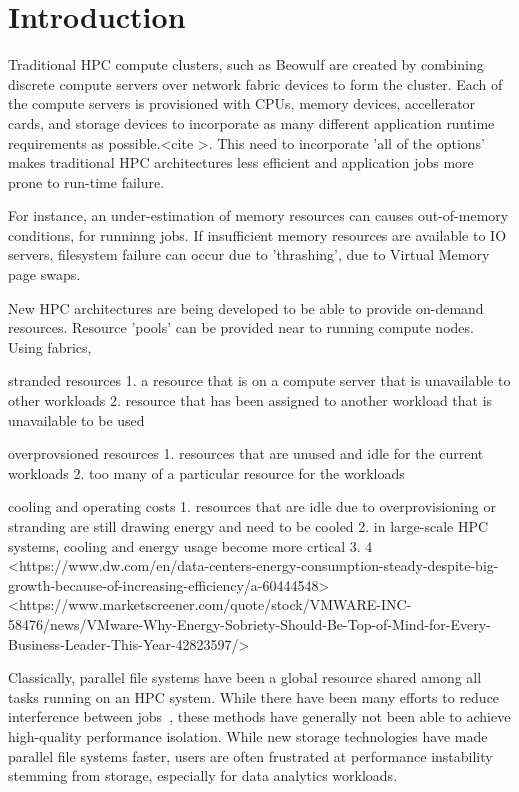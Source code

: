 \section{Introduction}

Traditional HPC compute clusters, such as Beowulf are created by combining discrete compute servers over network fabric devices to form the cluster.  Each of the compute servers is provisioned with CPUs, memory devices, accellerator cards, and storage devices to incorporate as many different application runtime requirements as possible.<cite >. This need to incorporate 'all of the options' makes traditional HPC architectures less efficient and application jobs more prone to run-time failure.    

For instance, an under-estimation of memory resources can causes out-of-memory conditions, for runninng jobs.  If insufficient memory resources are available to IO servers, filesystem failure can occur due to 'thrashing', due to Virtual Memory page swaps.

New HPC architectures are being developed to be able to provide on-demand resources.  Resource 'pools' can be provided near to running compute nodes.  Using fabrics,  

stranded resources
  1.  a resource that is on a compute server that is unavailable to other workloads
  2.  resource that has been assigned to another workload that is unavailable to be used
 
 overprovsioned resources
  1.  resources that are unused and idle for the current workloads
  2.  too many of a particular resource for the workloads

cooling and operating costs
  1.  resources that are idle due to overprovisioning or stranding are still drawing energy and need to be cooled
  2.  in large-scale HPC systems, cooling and energy usage become more crtical 
  3.  4%
  <https://www.dw.com/en/data-centers-energy-consumption-steady-despite-big-growth-because-of-increasing-efficiency/a-60444548>
  <https://www.marketscreener.com/quote/stock/VMWARE-INC-58476/news/VMware-Why-Energy-Sobriety-Should-Be-Top-of-Mind-for-Every-Business-Leader-This-Year-42823597/>
  
Classically, parallel file systems have been a global resource shared among all tasks running on an HPC system. While there have been many efforts to reduce interference between jobs~\cite{10.1145/2063384.2063407,7573843}, these methods have generally not been able to achieve high-quality performance isolation. While new storage technologies have made parallel file systems faster, users are often frustrated at performance instability stemming from storage, especially for data analytics workloads.

